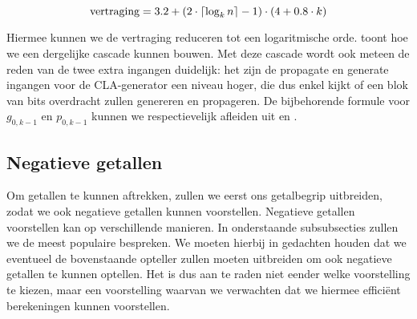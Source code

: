 \begin{equation}
\mbox{vertraging}=3.2+\left( 2\cdot\left\lceil \log_kn \right\rceil-1 \right)\cdot\left( 4+0.8\cdot k \right)
\end{equation}

Hiermee kunnen we de vertraging reduceren tot een logaritmische orde.  toont hoe we een dergelijke cascade kunnen bouwen. Met deze cascade wordt ook meteen de reden van de twee extra ingangen duidelijk: het zijn de propagate en generate ingangen voor de CLA-generator een niveau hoger, die dus enkel kijkt of een blok van bits overdracht zullen genereren en propageren. De bijbehorende formule voor $g_{0,k-1}$ en $p_{0,k-1}$ kunnen we respectievelijk afleiden uit  en .

\subsection{Negatieve getallen}
Om getallen te kunnen aftrekken, zullen we eerst ons getalbegrip uitbreiden, zodat we ook negatieve getallen kunnen voorstellen. Negatieve getallen voorstellen kan op verschillende manieren. In onderstaande subsubsecties zullen we de meest populaire bespreken. We moeten hierbij in gedachten houden dat we eventueel de bovenstaande opteller zullen moeten uitbreiden om ook negatieve getallen te kunnen optellen. Het is dus aan te raden niet eender welke voorstelling te kiezen, maar een voorstelling waarvan we verwachten dat we hiermee effici\"ent berekeningen kunnen voorstellen.

